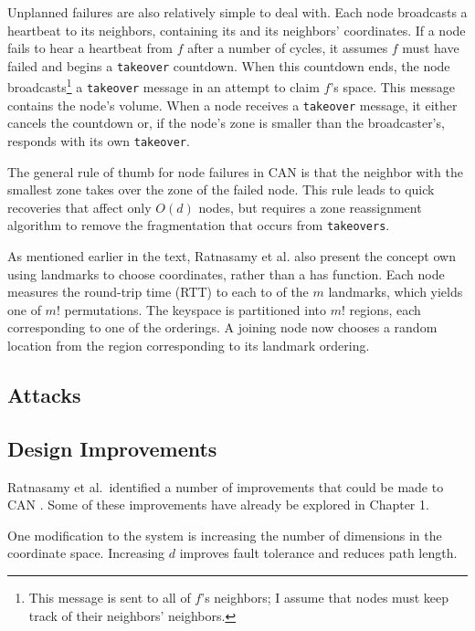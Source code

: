 \documentclass[10pt,letterpaper,twoside]{report}
\begin{document}
Unplanned failures are also relatively simple to deal with.
Each node broadcasts a heartbeat to its neighbors, containing its and its neighbors' coordinates.
If a node fails to hear a heartbeat from $f$ after a number of cycles, it assumes $f$ must have failed and begins a \texttt{takeover} countdown.
When this countdown ends, the node broadcasts\footnote{This message is sent to all of $f$'s neighbors;  I assume that nodes must keep track of their neighbors' neighbors.} a \texttt{takeover} message in an attempt to claim $f$'s space.
This message contains the node's volume.
When a node receives a \texttt{takeover} message, it either cancels the countdown or, if the node's zone is smaller than the broadcaster's, responds with its own \texttt{takeover}.

The general rule of thumb for node failures in CAN is that the neighbor with the smallest zone takes over the zone of the failed node.
This rule leads to quick recoveries that affect only $O(d)$ nodes, but requires  a zone reassignment algorithm to remove the fragmentation that occurs from \texttt{takeovers}.

As mentioned earlier in the text, Ratnasamy et al. \cite{can}  also present the concept own using landmarks to choose coordinates, rather than a has function.
Each node measures the round-trip time (RTT) to each to of the $m$ landmarks, which yields one of $m!$ permutations.
The keyspace is partitioned into $m!$ regions, each corresponding to one of the orderings.  
A joining node now chooses a random location from the region corresponding to its landmark ordering.

\subsection*{Attacks}








\subsection*{Design Improvements}
Ratnasamy et al.\ identified a number of improvements that could be made to CAN \cite{can}.
Some of these improvements have already be explored in Chapter 1.

One modification to the system is increasing the number of dimensions in the coordinate space.
Increasing $d$ improves fault tolerance and reduces path length.
\end{document}
